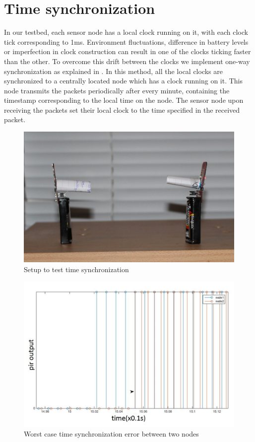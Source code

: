 \section{Time synchronization}
In our testbed, each sensor node has a local clock running on it, with each clock tick corresponding to 1ms. Environment fluctuations, difference in battery levels or imperfection in clock construction can result in one of the clocks ticking faster than the other. To overcome this drift between the clocks we implement one-way synchronization as explained in \cite{kerkez2012adaptive}. In this method, all the local clocks are synchronized to a centrally located node which has a clock running on it. This node transmits the packets periodically after every minute, containing the timestamp corresponding to the local time on the node. The sensor node upon receiving the packets set their local clock to the time specified in the received packet. 
\begin{figure}[!ht]
\includegraphics[scale=0.1]{./pics/timesync.jpg}
\caption{Setup to test time synchronization}
\label{fig:timeSync}
\end{figure}

\begin{figure}
\includegraphics[scale=0.5]{./pics/timeSyncErr}
\caption{Worst case time synchronization error between two nodes}
\label{fig:timeSyncErr}
\end{figure}

